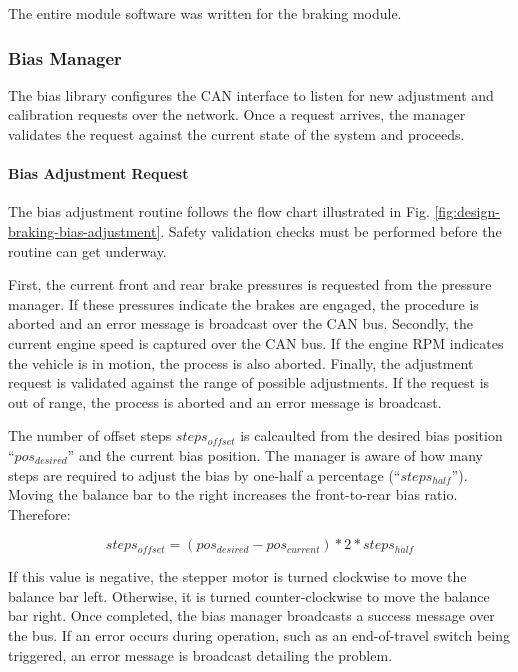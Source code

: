 The entire module software was written for the braking module. 

\subsubsection{Bias Manager}

The bias library configures the CAN interface to listen for new adjustment and calibration requests over the network. Once a request arrives, the manager validates the request against the current state of the system and proceeds.

\paragraph{Bias Adjustment Request}
\label{sec:impl_braking_bar}

The bias adjustment routine follows the flow chart illustrated in Fig. \ref{fig:design-braking-bias-adjustment}. Safety validation checks must be performed before the routine can get underway. 

First, the current front and rear brake pressures is requested from the pressure manager. If these pressures indicate the brakes are engaged, the procedure is aborted and an error message is broadcast over the CAN bus. Secondly, the current engine speed is captured over the CAN bus. If the engine RPM indicates the vehicle is in motion, the process is also aborted. Finally, the adjustment request is validated against the range of possible adjustments. If the request is out of range, the process is aborted and an error message is broadcast.

The number of offset steps $steps_{offset}$ is calcaulted from the desired bias position ``$pos_{desired}$'' and the current bias position. The manager is aware of how many steps are required to adjust the bias by one-half a percentage (``$steps_{half}$''). Moving the balance bar to the right increases the front-to-rear bias ratio. Therefore:

\[
steps_{offset} = (pos_{desired} - pos_{current}) * 2 * steps_{half}
\]

If this value is negative, the stepper motor is turned clockwise to move the balance bar left. Otherwise, it is turned counter-clockwise to move the balance bar right. Once completed, the bias manager broadcasts a success message over the bus. If an error occurs during operation, such as an end-of-travel switch being triggered, an error message is broadcast detailing the problem. 

